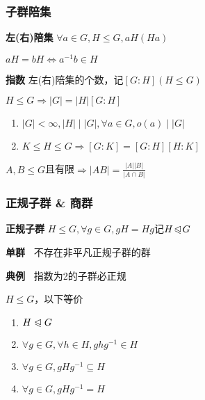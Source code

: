 \documentclass[a4paper,10pt]{ctexart}
\newcommand*{\impl}{\Rightarrow}
\renewcommand*{\iff}{\Leftrightarrow}
\renewcommand*{\leq}{\leqslant}
\newcommand*{\nmsubgroupeq}{\trianglelefteqslant}
\begin{document}
\begin{multicols}{3}
    \subsubsection{子群陪集}

    \textbf{左(右)陪集} $\forall a \!\in\! G, H \!\leq\! G, aH(Ha)$

    \begin{theorem}[陪集相等判则]
        $aH = bH \iff a^{-1}b \in H$
    \end{theorem}

    \textbf{指数} 左(右)陪集的个数，记$[G\!:\!H](H \!\leq\! G)$

    \begin{theorem}[Lagrange定理]
        $H \!\leq\! G \!\impl\! |G| \! = \! |H|[G:H]$
    \end{theorem}

    \begin{theorem}[指数性质]
        \hfil

        \begin{enumerate}
            \item $|G| < \infty, |H| \mid |G|, \forall a \in G, o(a) \mid |G|$
            \item $K \!\leq\! H \!\leq\! G \!\impl\! [G\!:\!K] \! = \! [G\!:\!H][H\!:\!K]$
        \end{enumerate}
    \end{theorem}

    \begin{theorem}[子群阶]
        $A, B \!\leq\! G$且有限$\impl |AB| = \frac{ |A| |B| }{ |A \cap B| }$
    \end{theorem}

    \subsubsection{正规子群 \& 商群}

    \textbf{正规子群} $H \!\!\leq\!\! G, \forall g \!\in\! G, gH \! = \! Hg$记$H \!\nmsubgroupeq\! G$

    \textbf{单群\ } 不存在非平凡正规子群的群

    \textbf{典例\ } 指数为2的子群必正规

    \begin{theorem}[正规子群判则]
        $H \leq G$，以下等价
        \begin{enumerate}
            \item $H \nmsubgroupeq G$
            \item $\forall g \in G,\forall h \in H, ghg^{-1} \in H$
            \item $\forall g \in G, gHg^{-1} \subseteq H$
            \item $\forall g \in G, gHg^{-1} = H$
        \end{enumerate}
    \end{theorem}


\end{multicols}
\end{document}
